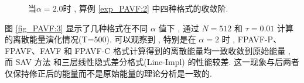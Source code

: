 	\begin{figure}[H]
		\begin{center}
		\caption{当$\alpha=2.0$时 , 算例 \ref{exp_PAVF:2}  中四种格式的收敛阶.}
		\label{fig_PAVF:2}
		\end{center}
		\end{figure}
\newpage
		图 \ref{fig_PAVF:3} 显示了几种格式在不同 $\alpha$ 值下 , 通过 $N=512$ 和 $\tau=0.01$ 计算的离散能量演化情况(T=500).
		可以观察到 , 特别是在 $\alpha=2$ 时 , FPAVF-P、FPAVF、FAVF 和 FPAVF-C 格式计算得到的离散能量均一致收敛到原始能量 , 
		而 SAV 方法 \cite{chengConvergenceEnergyconservingScheme2022} 和三层线性隐式差分格式(Line-Impl) \cite{ranLinearlyImplicitConservative2016} 的性能较差.
		这一现象与后两者仅保持修正后的能量而不是原始能量的理论分析是一致的.		


